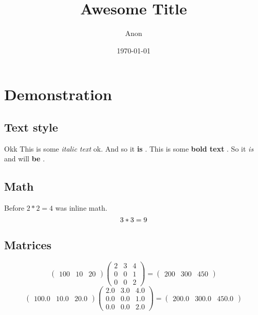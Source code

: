 \documentclass[titlepage]{article}%
\title{Awesome Title}%
\author{Anon}%
\date{\today}%
\begin{document}
%
\normalsize%
\maketitle%
%
\section{Demonstration}%
\label{sec:Demonstration}%

%
\subsection{Text style}%
\label{subsec:Textstyle}%

%
%
Okk%
%
This is some %
\textit{italic text}%
\hspace{1pt} %
 ok. And so it %
\textbf{is}%
.%
\newline%
%
This is some %
\textbf{bold text}%
. So it %
\textit{is}%
\hspace{1pt} %
 and will %
\textbf{be}%
. %
%
\subsection{Math}%
\label{subsec:Math}%

%
%
Before %
$2*2 = 4$%
\hspace{1pt} %
 was inline math.%
\[%
3*3 = 9\newline%
%
\]%
%
\subsection{Matrices}%
\label{subsec:Matrices}%

%
%
\[%
\begin{pmatrix}%
100&10&20%
\end{pmatrix} \begin{pmatrix}%
2&3&4\\%
0&0&1\\%
0&0&2%
\end{pmatrix} = \begin{pmatrix}%
200&300&450%
\end{pmatrix}%
\]%
\[%
\begin{pmatrix}%
100.0&10.0&20.0%
\end{pmatrix} \begin{pmatrix}%
2.0&3.0&4.0\\%
0.0&0.0&1.0\\%
0.0&0.0&2.0%
\end{pmatrix} = \begin{pmatrix}%
200.0&300.0&450.0%
\end{pmatrix}%
\]%
%
\end{document}
